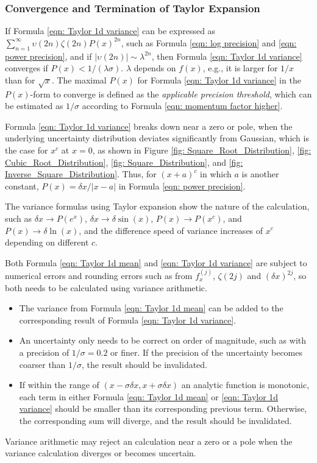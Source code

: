 \documentclass[twoside]{article}
\numberwithin{equation}{section}
\begin{document}
\subsubsection{Convergence and Termination of Taylor Expansion}


If Formula \eqref{eqn: Taylor 1d variance} can be expressed as $\sum_{n=1}^{\infty} \upsilon(2n) \zeta(2n) P(x)^{2n}$, such as Formula \eqref{eqn: log precision} and \eqref{eqn: power precision}, and if $|\upsilon(2n)| \sim \lambda^{2n}$, then Formula \eqref{eqn: Taylor 1d variance} converges if $P(x) < 1/(\lambda \sigma)$.
$\lambda$ depends on $f(x)$, e.g., it is larger for $1/x$ than for $\sqrt{x}$.
The maximal $P(x)$ for Formula \eqref{eqn: Taylor 1d variance} in the $P(x)$-form to converge is defined as the \emph{applicable precision threshold}, which can be estimated as $1/\sigma$ according to Formula \eqref{eqn: momentum factor higher}.

Formula \eqref{eqn: Taylor 1d variance} breaks down near a zero or pole, when the underlying uncertainty distribution deviates significantly from Gaussian, which is the case for $x^c$ at $x=0$, as shown in Figure \ref{fig: Square_Root_Distribution}, \ref{fig: Cubic_Root_Distribution}, \ref{fig: Square_Distribution}, and \ref{fig: Inverse_Square_Distribution}.
Thus, for $(x+a)^c$ in which $a$ is another constant, $P(x) = \delta x / |x - a|$ in Formula \eqref{eqn: power precision}.

The variance formulas using Taylor expansion show the nature of the calculation, such as $\delta x \rightarrow P(e^x)$, $\delta x \rightarrow \delta \sin(x)$, $P(x) \rightarrow P(x^c)$, and $P(x) \rightarrow \delta \ln(x)$, and the difference speed of variance increases of $x^c$ depending on different $c$.

Both Formula \eqref{eqn: Taylor 1d mean} and \eqref{eqn: Taylor 1d variance} are subject to numerical errors and rounding errors such as from $f^{(j)}_x$, $\zeta(2j)$ and $(\delta x)^{2j}$, so both needs to be calculated using variance arithmetic.
\begin{itemize}
\item  The variance from Formula \eqref{eqn: Taylor 1d mean} can be added to the corresponding result of Formula \eqref{eqn: Taylor 1d variance}.

\item An uncertainty only needs to be correct on order of magnitude, such as with a precision of $1/\sigma=0.2$ or finer.
If the precision of the uncertainty becomes coarser than $1/\sigma$, the result should be invalidated.

\item If within the range of $(x - \sigma \delta x, x + \sigma \delta x)$ an analytic function is monotonic, each term in either Formula \eqref{eqn: Taylor 1d mean} or \eqref{eqn: Taylor 1d variance} should be smaller than its corresponding previous term.
Otherwise, the corresponding sum will diverge, and the result should be invalidated.

\end{itemize}
Variance arithmetic may reject an calculation near a zero or a pole when the variance calculation diverges or becomes uncertain.
\end{document}
